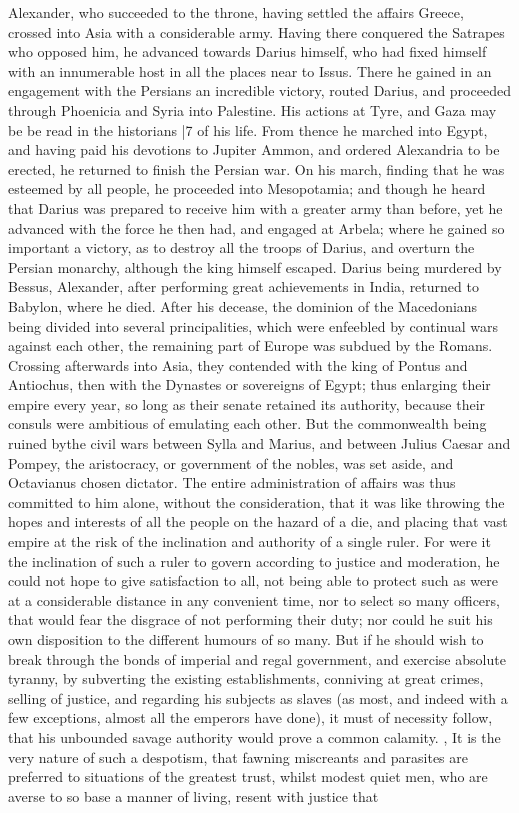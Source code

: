 Alexander, who succeeded to the throne, having settled the affairs Greece, crossed into Asia with a considerable army. Having there conquered the Satrapes who opposed him, he advanced towards Darius himself, who had fixed himself with an innumerable host in all the places near to Issus. There he gained in an engagement with the Persians an incredible victory, routed Darius, and proceeded through Phoenicia and Syria into Palestine. His actions at Tyre, and Gaza may be be read in the historians
|7 of his life. From thence he marched into Egypt, and having paid his devotions to Jupiter Ammon, and ordered Alexandria to be erected, he returned to finish the Persian war. On his march, finding that he was esteemed by all people, he proceeded into Mesopotamia; and though he heard that Darius was prepared to receive him with a greater army than before, yet he advanced with the force he then had, and engaged at Arbela; where he gained so important a victory, as to destroy all the troops of Darius, and overturn the Persian monarchy, although the king himself escaped. Darius being murdered by Bessus, Alexander, after performing great achievements in India, returned to Babylon, where he died. After his decease, the dominion of the Macedonians being divided into several principalities, which were enfeebled by continual wars against each other, the remaining part of Europe was subdued by the Romans. Crossing afterwards into Asia, they contended with the king of Pontus and Antiochus, then with the Dynastes or sovereigns of Egypt; thus enlarging their empire every year, so long as their senate retained its authority, because their consuls were ambitious of emulating each other. But the commonwealth being ruined by\emph{}the civil wars between Sylla and Marius, and between Julius Caesar and Pompey, the aristocracy, or government of the nobles, was set aside, and Octavianus chosen dictator. The entire administration of affairs was thus committed to him alone, without the consideration, that it was like throwing the hopes and interests of all the people on the hazard of a die, and placing that vast empire at the risk of the inclination and authority of a single ruler. For were it the inclination of such a ruler to govern according to justice and moderation, he could not hope to give satisfaction to all, not being able to protect such as were at a considerable distance in any convenient time, nor to select so many officers, that would fear the disgrace of not performing their duty; nor could he suit his own disposition to the different humours of so many. But if he should wish to break through the bonds of imperial and regal government, and exercise absolute tyranny, by subverting the existing establishments, conniving at great crimes, selling of justice, and regarding his subjects as slaves (as most, and indeed with a few exceptions, almost all the emperors have done), it must of necessity follow, that his unbounded savage authority would prove a common calamity. , It is the very nature of such a despotism, that fawning miscreants and parasites are preferred to situations of the greatest trust, whilst modest quiet men, who are averse to so base a manner of living, resent with justice that
